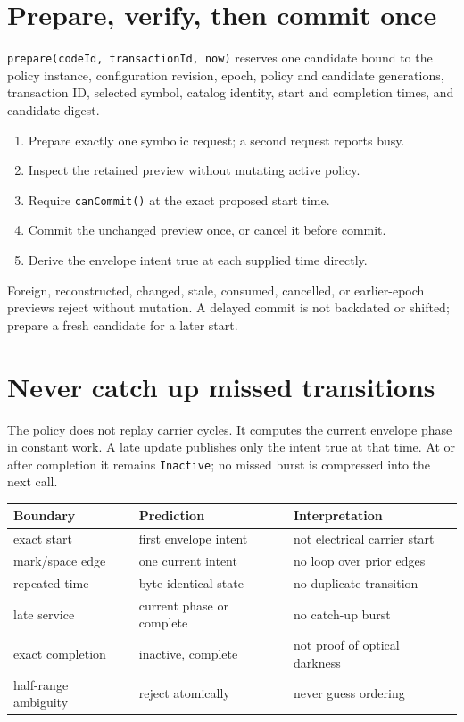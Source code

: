 \documentclass[10pt]{article}
\begin{document}
\section{Prepare, verify, then commit once}
\texttt{prepare(codeId, transactionId, now)} reserves one candidate bound to
the policy instance, configuration revision, epoch, policy and candidate
generations, transaction ID, selected symbol, catalog identity, start and
completion times, and candidate digest.

\begin{enumerate}
 \item Prepare exactly one symbolic request; a second request reports busy.
 \item Inspect the retained preview without mutating active policy.
 \item Require \texttt{canCommit()} at the exact proposed start time.
 \item Commit the unchanged preview once, or cancel it before commit.
 \item Derive the envelope intent true at each supplied time directly.
\end{enumerate}

Foreign, reconstructed, changed, stale, consumed, cancelled, or earlier-epoch
previews reject without mutation. A delayed commit is not backdated or shifted;
prepare a fresh candidate for a later start.

\section{Never catch up missed transitions}
The policy does not replay carrier cycles. It computes the current envelope
phase in constant work. A late update publishes only the intent true at that
time. At or after completion it remains \texttt{Inactive}; no missed burst is
compressed into the next call.

\begin{tabularx}{\linewidth}{@{}l X X@{}}
\toprule
Boundary & Prediction & Interpretation\\
\midrule
exact start & first envelope intent & not electrical carrier start\\
mark/space edge & one current intent & no loop over prior edges\\
repeated time & byte-identical state & no duplicate transition\\
late service & current phase or complete & no catch-up burst\\
exact completion & inactive, complete & not proof of optical darkness\\
half-range ambiguity & reject atomically & never guess ordering\\
\bottomrule
\end{tabularx}
\end{document}
